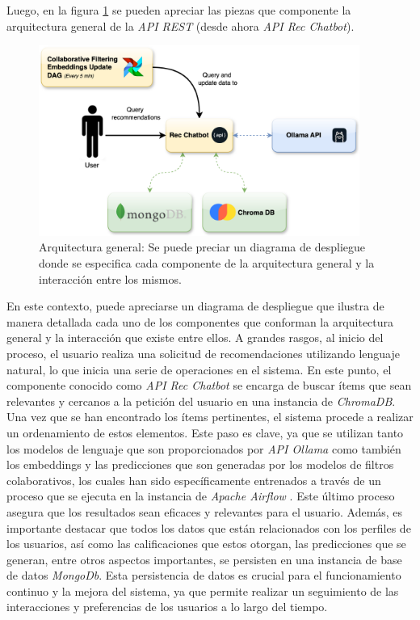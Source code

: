 \documentclass[11pt,a4paper,twoside]{thesis}
\begin{document}
Luego, en la figura \ref{fig:deployment} se pueden apreciar las piezas que componente la arquitectura general de la \textit{API REST} (desde ahora \textit{API Rec Chatbot}).
\vfill

\begin{figure}[H]
	\centering
	\label{fig:deployment}
	\includegraphics[width=10.5cm]{./images/deployment.png}
	\caption{Arquitectura general: Se puede preciar un diagrama de despliegue donde se especifica cada componente de la arquitectura general y la interacción entre los mismos.}
\end{figure}

En este contexto, puede apreciarse un diagrama de despliegue que ilustra de manera detallada cada uno de los componentes que conforman la arquitectura general y la interacción que existe entre ellos. A grandes rasgos, al inicio del proceso, el usuario realiza una solicitud de recomendaciones utilizando lenguaje natural, lo que inicia una serie de operaciones en el sistema. En este punto, el componente conocido como \textit{API Rec Chatbot} se encarga de buscar ítems que sean relevantes y cercanos a la petición del usuario en una instancia de \textit{ChromaDB}. Una vez que se han encontrado los ítems pertinentes, el sistema procede a realizar un ordenamiento de estos elementos. Este paso es clave, ya que se utilizan tanto los modelos de lenguaje que son proporcionados por \textit{API Ollama} como también los embeddings y las predicciones que son generadas por los modelos de filtros colaborativos, los cuales han sido específicamente entrenados a través de un proceso que se ejecuta en la instancia de \textit{Apache Airflow} \cite{apache-airflow}. Este último proceso asegura que los resultados sean eficaces y relevantes para el usuario. Además, es importante destacar que todos los datos que están relacionados con los perfiles de los usuarios, así como las calificaciones que estos otorgan, las predicciones que se generan, entre otros aspectos importantes, se persisten en una instancia de base de datos \textit{MongoDb}. Esta persistencia de datos es crucial para el funcionamiento continuo y la mejora del sistema, ya que permite realizar un seguimiento de las interacciones y preferencias de los usuarios a lo largo del tiempo.
\end{document}
